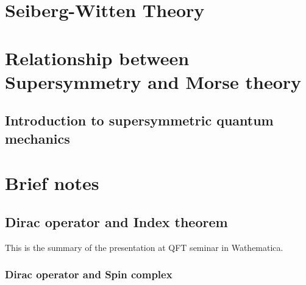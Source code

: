 \documentclass[a4paper,pdftex,10pt]{report}
\begin{document}
\clearpage
\appendix
\chapter{Seiberg-Witten Theory}




























\clearpage
\chapter{Relationship between Supersymmetry and Morse theory}



\section{Introduction to supersymmetric quantum mechanics}
























\clearpage
\chapter{Brief notes}

\section{Dirac operator and Index theorem}

This is the summary of the presentation at QFT seminar in Wathematica.

\subsection{Dirac operator and Spin complex}
\end{document}
